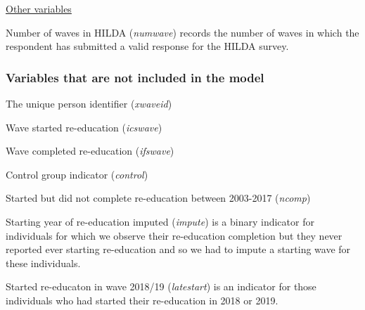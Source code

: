 \documentclass[12pt, a4paper]{article}
\begin{document}
\underline{Other variables}

Number of waves in HILDA (\textit{numwave}) records the number of waves in which the respondent has submitted a valid response for the HILDA survey. 

\subsubsection{Variables that are not included in the model}

The unique person identifier (\textit{xwaveid})

Wave started re-education (\textit{icswave}) 

Wave completed re-education (\textit{ifswave}) 

Control group indicator (\textit{control}) 

Started but did not complete re-education between 2003-2017 (\textit{ncomp}) 

Starting year of re-education imputed (\textit{impute}) is a binary indicator for individuals for which we observe their re-education completion but they never reported ever starting re-education and so we had to impute a starting wave for these individuals.  

Started re-educaton in wave 2018/19 (\textit{latestart}) is an indicator for those individuals who had started their re-education in 2018 or 2019. 
\end{document}

